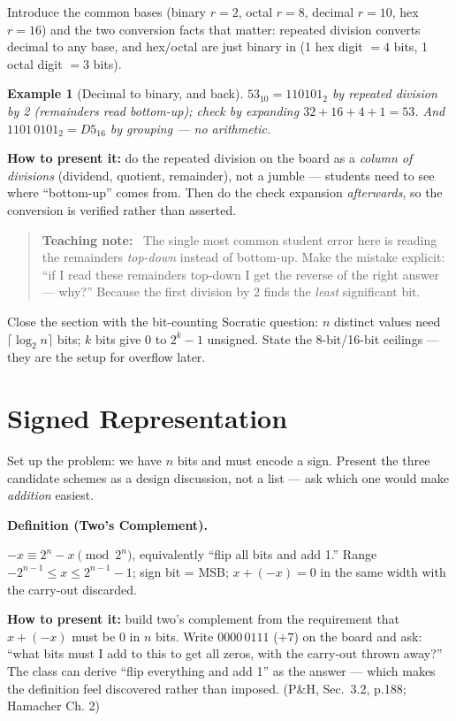 \documentclass[11pt]{article}
\newtheorem{example}{Example}[section]
\newenvironment{definitionbox}[1]{%
  \par\noindent\textbf{Definition (#1).}\ \itshape
}{\par\vspace{0.3em}}
\newenvironment{teachingaside}{\begin{quote}\small\color{primary-gold}\textbf{Teaching note:}\ }{\end{quote}}
\begin{document}
Introduce the common bases (binary $r=2$, octal $r=8$, decimal $r=10$, hex $r=16$) and the two conversion facts that matter: repeated division converts decimal to any base, and hex/octal are just binary in  (1 hex digit $= 4$ bits, 1 octal digit $= 3$ bits).

\begin{example}[Decimal to binary, and back]
$53_{10} = 110101_2$ by repeated division by 2 (remainders read bottom-up); check by expanding $32+16+4+1 = 53$. And $1101\,0101_2 = D5_{16}$ by grouping --- no arithmetic.
\end{example}

\textbf{How to present it:} do the repeated division on the board as a \emph{column of divisions} (dividend, quotient, remainder), not a jumble --- students need to see where ``bottom-up'' comes from. Then do the check expansion \emph{afterwards}, so the conversion is verified rather than asserted.

\begin{teachingaside}
The single most common student error here is reading the remainders \emph{top-down} instead of bottom-up. Make the mistake explicit: ``if I read these remainders top-down I get the reverse of the right answer --- why?'' Because the first division by 2 finds the \emph{least} significant bit.
\end{teachingaside}

Close the section with the bit-counting Socratic question: $n$ distinct values need $\lceil \log_2 n \rceil$ bits; $k$ bits give $0$ to $2^k-1$ unsigned. State the 8-bit/16-bit ceilings --- they are the setup for overflow later.

\section{Signed Representation}

Set up the problem: we have $n$ bits and must encode a sign. Present the three candidate schemes as a design discussion, not a list --- ask which one would make \emph{addition} easiest.

\begin{definitionbox}{Two's Complement}
$-x \equiv 2^n - x \pmod{2^n}$, equivalently ``flip all bits and add 1.'' Range $-2^{n-1} \le x \le 2^{n-1}-1$; sign bit = MSB; $x + (-x) = 0$ in the same width with the carry-out discarded.
\end{definitionbox}

\textbf{How to present it:} build two's complement from the requirement that $x + (-x)$ must be $0$ in $n$ bits. Write $0000\,0111$ ($+7$) on the board and ask: ``what bits must I add to this to get all zeros, with the carry-out thrown away?'' The class can derive ``flip everything and add 1'' as the answer --- which makes the definition feel discovered rather than imposed. (P\&H, Sec.~3.2, p.188; Hamacher Ch. 2) \cite{PattersonHennessy2017_computer_organization_design,Hamacher2002_computer_organization}
\end{document}
